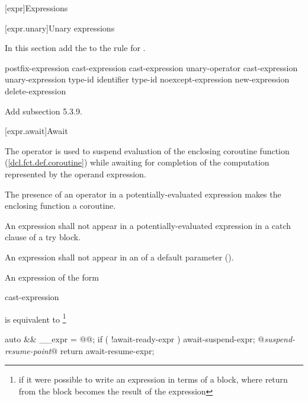 

\setcounter{chapter}{4}
[expr]{Expressions}

\setcounter{section}{2}
[expr.unary]{Unary expressions}

In this section add the   
to the rule for .

\begin{bnf}
	\br
	postfix-expression\br
	\terminal{++} cast-expression\br
	\terminal{-{-}} cast-expression\br
	\br
	unary-operator cast-expression\br
	 unary-expression\br
	 type-id \terminal{)}\br
	 \terminal{(} identifier \terminal{)}\br
	 type-id \terminal{)}\br
	noexcept-expression\br
	new-expression\br
	delete-expression\br
\end{bnf}

Add subsection 5.3.9.

\setcounter{subsection}{8}
[expr.await]{Await}

\pnum
The  operator is used to suspend evaluation of the enclosing coroutine function (\ref{dcl.fct.def.coroutine}) while awaiting
for completion of the computation represented by the operand expression.

\pnum
The presence of an  operator in a potentially-evaluated expression makes the enclosing function a coroutine.

\pnum
An  expression shall not appear in a potentially-evaluated expression in a catch clause of a try block.

\pnum
An  expression shall not appear in an  of a default parameter ().


\pnum
An  expression of the form

\begin{ncbnf}
	 cast-expression
\end{ncbnf}

is equivalent to \footnote{if it were possible to write
an expression in terms of a block, where return from the 
block becomes the result of the expression}

\begin{codeblock}
{
  auto && __expr = @@;
  if ( !await-ready-expr ) {
    await-suspend-expr;
    @\textit{suspend-resume-point}@
  }
  return await-resume-expr;
}
\end{codeblock}


